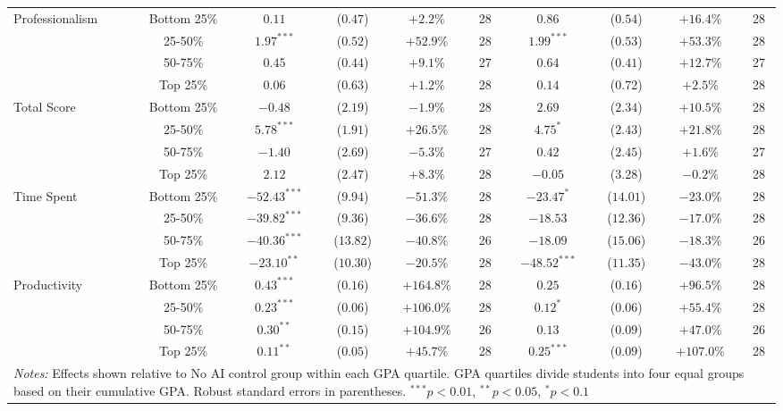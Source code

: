 \begin{table}[!htbp]
\begin{tabular}{lccccccccc}
\hline
\multirow{4}{*}{Professionalism} & Bottom 25\% & $0.11$ & ($0.47$) & $+2.2\%$ & 28 & $0.86$ & ($0.54$) & $+16.4\%$ & 28 \\
& 25-50\% & $1.97^{***}$ & ($0.52$) & $+52.9\%$ & 28 & $1.99^{***}$ & ($0.53$) & $+53.3\%$ & 28 \\
& 50-75\% & $0.45$ & ($0.44$) & $+9.1\%$ & 27 & $0.64$ & ($0.41$) & $+12.7\%$ & 27 \\
& Top 25\% & $0.06$ & ($0.63$) & $+1.2\%$ & 28 & $0.14$ & ($0.72$) & $+2.5\%$ & 28 \\
\hline
\multirow{4}{*}{Total Score} & Bottom 25\% & $-0.48$ & ($2.19$) & $-1.9\%$ & 28 & $2.69$ & ($2.34$) & $+10.5\%$ & 28 \\
& 25-50\% & $5.78^{***}$ & ($1.91$) & $+26.5\%$ & 28 & $4.75^{*}$ & ($2.43$) & $+21.8\%$ & 28 \\
& 50-75\% & $-1.40$ & ($2.69$) & $-5.3\%$ & 27 & $0.42$ & ($2.45$) & $+1.6\%$ & 27 \\
& Top 25\% & $2.12$ & ($2.47$) & $+8.3\%$ & 28 & $-0.05$ & ($3.28$) & $-0.2\%$ & 28 \\
\hline
\multirow{4}{*}{Time Spent} & Bottom 25\% & $-52.43^{***}$ & ($9.94$) & $-51.3\%$ & 28 & $-23.47^{*}$ & ($14.01$) & $-23.0\%$ & 28 \\
& 25-50\% & $-39.82^{***}$ & ($9.36$) & $-36.6\%$ & 28 & $-18.53$ & ($12.36$) & $-17.0\%$ & 28 \\
& 50-75\% & $-40.36^{***}$ & ($13.82$) & $-40.8\%$ & 26 & $-18.09$ & ($15.06$) & $-18.3\%$ & 26 \\
& Top 25\% & $-23.10^{**}$ & ($10.30$) & $-20.5\%$ & 28 & $-48.52^{***}$ & ($11.35$) & $-43.0\%$ & 28 \\
\hline
\multirow{4}{*}{Productivity} & Bottom 25\% & $0.43^{***}$ & ($0.16$) & $+164.8\%$ & 28 & $0.25$ & ($0.16$) & $+96.5\%$ & 28 \\
& 25-50\% & $0.23^{***}$ & ($0.06$) & $+106.0\%$ & 28 & $0.12^{*}$ & ($0.06$) & $+55.4\%$ & 28 \\
& 50-75\% & $0.30^{**}$ & ($0.15$) & $+104.9\%$ & 26 & $0.13$ & ($0.09$) & $+47.0\%$ & 26 \\
& Top 25\% & $0.11^{**}$ & ($0.05$) & $+45.7\%$ & 28 & $0.25^{***}$ & ($0.09$) & $+107.0\%$ & 28 \\
\hline
\multicolumn{10}{p{0.95\linewidth}}{\footnotesize \textit{Notes:} Effects shown relative to No AI control group within each GPA quartile. GPA quartiles divide students into four equal groups based on their cumulative GPA. Robust standard errors in parentheses. $^{***}p<0.01$, $^{**}p<0.05$, $^{*}p<0.1$}
\end{tabular}
\end{table}
